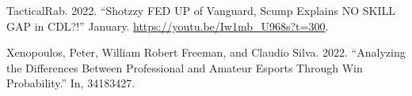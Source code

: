 \documentclass{article}
\newlength{\cslhangindent}
\newlength{\cslentryspacingunit} %
\newenvironment{CSLReferences}[2] %
 {%
  \setlength{\parindent}{0pt}
  \ifodd #1
  \let\oldpar\par
  \def\par{\hangindent=\cslhangindent\oldpar}
  \fi
  \setlength{\parskip}{#2\cslentryspacingunit}
 }%
 {}
\begin{document}
\begin{CSLReferences}{1}{0}
\leavevmode{}%
TacticalRab. 2022. {``Shotzzy FED UP of Vanguard, Scump Explains NO
SKILL GAP in CDL?!''} January. \url{https://youtu.be/Iw1mb_U968s?t=300}.

\leavevmode{}%
Xenopoulos, Peter, William Robert Freeman, and Claudio Silva. 2022.
{``Analyzing the Differences Between Professional and Amateur Esports
Through Win Probability.''} In, 34183427.

\end{CSLReferences}



\end{document}
